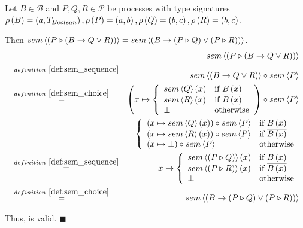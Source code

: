 \begin{myproof}
Let $B \in \mathcal{B}$ and $P, Q, R \in \mathcal{P}$ be processes with type signatures $\rho \left( B \right) = \left( a, T_{Boolean} \right), \rho \left( P \right) = \left( a, b \right), \rho \left( Q \right) = \left( b, c \right), \rho \left( R \right) = \left( b, c \right)$. 

Then $sem \left\langle \left( P \triangleright \left( B \to Q \vee R \right) \right) \right\rangle = sem \left\langle \left( B \to \left( P \triangleright Q \right) \vee \left( P \triangleright R \right) \right) \right\rangle$.
\begin{eqnarray*}
  & & \sem{\sequence{P}{\choice{B}{Q}{R}}} \\
  & \overset{\defref{def:sem_sequence}}{=} & \sem{\choice{B}{Q}{R}} \circ \sem{P} \\
  & \overset{\defref{def:sem_choice}}{=}   & \left( x \mapsto \left\{\begin{array}{ll}
                                                                       \sem{Q} \left( x \right) & \text{if } B \left( x \right) \\
                                                                       \sem{R} \left( x \right) & \text{if } \overline{B \left( x \right)} \\
                                                                       \bot & \text{otherwise}
                                                                     \end{array}
                                                              \right.\right) \circ \sem{P} \\
  & = & \left\{\begin{array}{ll}
                 \left( x \mapsto \sem{Q} \left( x \right) \right) \circ \sem{P} & \text{if } B \left( x \right) \\
                 \left( x \mapsto \sem{R} \left( x \right) \right) \circ \sem{P} & \text{if } \overline{B \left( x \right)} \\
                 \left( x \mapsto \bot \right) \circ \sem{P} & \text{otherwise}
               \end{array}
        \right. \\
  & \overset{\defref{def:sem_sequence}}{=} & x \mapsto \left\{\begin{array}{ll}
                                                                      \sem{\sequence{P}{Q}} \left( x \right) & \text{if } B \left( x \right) \\
                                                                      \sem{\sequence{P}{R}} \left( x \right) & \text{if } \overline{B \left( x \right)} \\
                                                                      \bot & \text{otherwise}
                                                          \end{array}
                                                   \right. \\
  & \overset{\defref{def:sem_choice}}{=}   & \sem{\choice{B}{\sequence{P}{Q}}{\sequence{P}{R}}}
\end{eqnarray*}

\vspace*{-0.75em}
Thus,  is valid. \hfill$\blacksquare$
\end{myproof}


